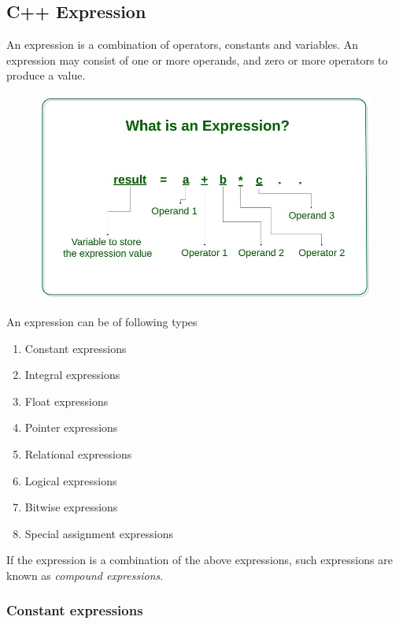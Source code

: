 \documentclass{book}
\begin{document}
\subsection{C++ Expression}

An expression is a combination of operators, constants and variables. An expression may consist of one or more operands, and zero or more operators to produce a value.

\begin{figure}[h]
\includegraphics[width=\columnwidth]{expressions}%
\caption{}%
\label{}%
\end{figure}

An expression can be of following types

\begin{enumerate}
	\item Constant expressions
\item Integral expressions
\item Float expressions
\item Pointer expressions
\item Relational expressions
\item Logical expressions
\item Bitwise expressions
\item Special assignment expressions
\end{enumerate}

If the expression is a combination of the above expressions, such expressions are known as \textit{compound expressions}.

\subsubsection{Constant expressions}
\end{document}
